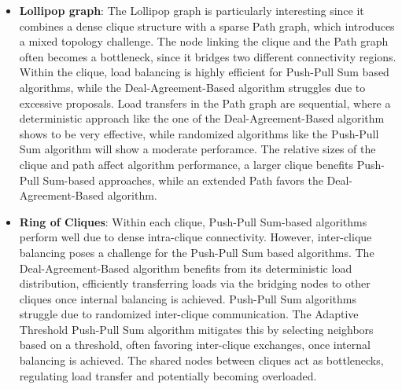 \begin{itemize}
    \item \textbf{Lollipop graph}: The Lollipop graph is particularly interesting since it combines a dense clique structure with a sparse Path graph, which introduces a mixed topology challenge. The node linking the clique and the Path graph often becomes a bottleneck, since it bridges two different connectivity regions. Within the clique, load balancing is highly efficient for Push-Pull Sum based algorithms, while the Deal-Agreement-Based algorithm struggles due to excessive proposals. Load transfers in the Path graph are sequential, where a deterministic approach like the one of the Deal-Agreement-Based algorithm shows to be very effective, while randomized algorithms like the Push-Pull Sum algorithm will show a moderate perforamce. The relative sizes of the clique and path affect algorithm performance, a larger clique benefits Push-Pull Sum-based approaches, while an extended Path favors the Deal-Agreement-Based algorithm.
    \item \textbf{Ring of Cliques}: Within each clique, Push-Pull Sum-based algorithms perform well due to dense intra-clique connectivity. However, inter-clique balancing poses a challenge for the Push-Pull Sum based algorithms. The Deal-Agreement-Based algorithm benefits from its deterministic load distribution, efficiently transferring loads via the bridging nodes to other cliques once internal balancing is achieved. Push-Pull Sum algorithms struggle due to randomized inter-clique communication. The Adaptive Threshold Push-Pull Sum algorithm mitigates this by selecting neighbors based on a threshold, often favoring inter-clique exchanges, once internal balancing is achieved. The shared nodes between cliques act as bottlenecks, regulating load transfer and potentially becoming overloaded.
\end{itemize}
